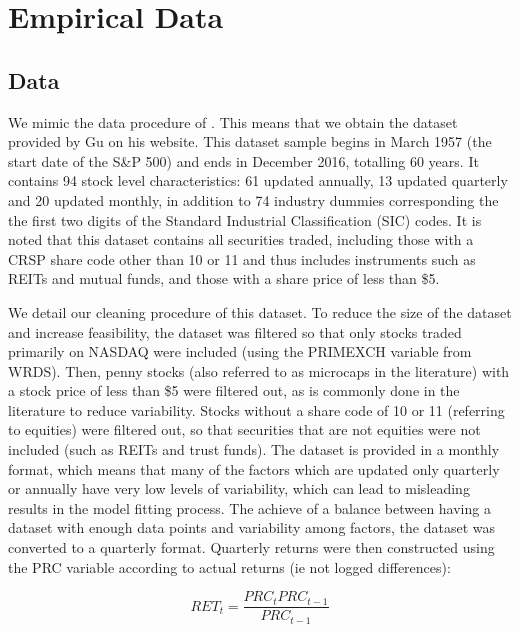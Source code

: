 \documentclass[a4paper, table]{article}
\begin{document}
\section{Empirical Data}

\subsection{Data}

We mimic the data procedure of \cite{gu_empirical_2018}. This means that we obtain the dataset provided by Gu on his website. This dataset sample begins in March 1957 (the start date of the S\&P 500) and ends in December 2016, totalling 60 years. It contains 94 stock level characteristics: 61 updated annually, 13 updated quarterly and 20 updated monthly, in addition to 74 industry dummies corresponding the the first two digits of the Standard Industrial Classification (SIC) codes. It is noted that this dataset contains all securities traded, including those with a CRSP share code other than 10 or 11 and thus includes instruments such as REITs and mutual funds, and those with a share price of less than \$5.


We detail our cleaning procedure of this dataset. To reduce the size of the dataset and increase feasibility, the dataset was filtered so that only stocks traded primarily on NASDAQ were included (using the PRIMEXCH variable from WRDS). Then, penny stocks (also referred to as microcaps in the literature) with a stock price of less than \$5 were filtered out, as is commonly done in the literature to reduce variability. Stocks without a share code of 10 or 11 (referring to equities) were filtered out, so that securities that are not equities were not included (such as REITs and trust funds). The dataset is provided in a monthly format, which means that many of the factors which are updated only quarterly or annually have very low levels of variability, which can lead to misleading results in the model fitting process. The achieve of a balance between having a dataset with enough data points and variability among factors, the dataset was converted to a quarterly format. Quarterly returns were then constructed using the PRC variable according to actual returns (ie not logged differences):

\begin{equation}
	RET_t = \frac{PRC_t PRC_{t-1}}{PRC_{t-1}}
\end{equation}
\end{document}
